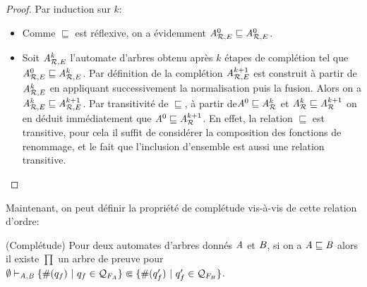 \begin{proof}
  Par induction sur $k$:
  
  \begin{itemize}
  \item Comme $\sqsubseteq$ est réflexive, on a évidemment ${\mathit A}_{\mathcal R,E}^0 \sqsubseteq {\mathit A}_{\mathcal R,E}^0$.
  \item Soit ${\mathit A}_{\mathcal R,E}^k$ l'automate d'arbres obtenu après $k$ étapes de complétion tel que ${\mathit A}_{\mathcal R,E}^0 \sqsubseteq {\mathit A}_{\mathcal R,E}^k$.
    Par définition de la complétion ${\mathit A}_{\mathcal R,E}^{k+1}$ est construit à partir de  ${\mathit A}_{\mathcal R,E}^k$ en appliquant successivement la normalisation puis la fusion.
   Alors on a ${\mathit A}_{\mathcal R,E}^k \sqsubseteq {\mathit A}_{\mathcal R,E}^{k+1}$.  
   Par transitivité de $\sqsubseteq$, à partir de$\mathit A^0 \sqsubseteq \mathit A_\mathcal R^k$ et
    $\mathit A_\mathcal R^k \sqsubseteq \mathit A_\mathcal R^{k+1}$ on en déduit immédiatement que $\mathit A^0 \sqsubseteq \mathit A_\mathcal R^{k+1}$.
    En effet, la relation $\sqsubseteq$ est transitive, pour cela il suffit de considérer la composition
    des fonctions de renommage, et le fait que l'inclusion d'ensemble est aussi une relation transitive.
  \end{itemize}
\end{proof}


Maintenant, on peut définir la propriété de complétude vis-à-vis de cette relation d'ordre:

\begin{theorem}{(Complétude)}
  Pour deux automates d'arbres donnés $\mathit A$ et $\mathit B$, si on a  $\mathit A \sqsubseteq \mathit B$ alors il existe
  $\prod$ un arbre de preuve pour $\emptyset \vdash_{\A, \B} \{\#(q_f)\ |\  q_f \in \mathcal{Q}_{F_A}\} \Subset  \{\#(q'_f)\ |\  q'_f \in \mathcal{Q}_{F_B}\}$.
\end{theorem}

